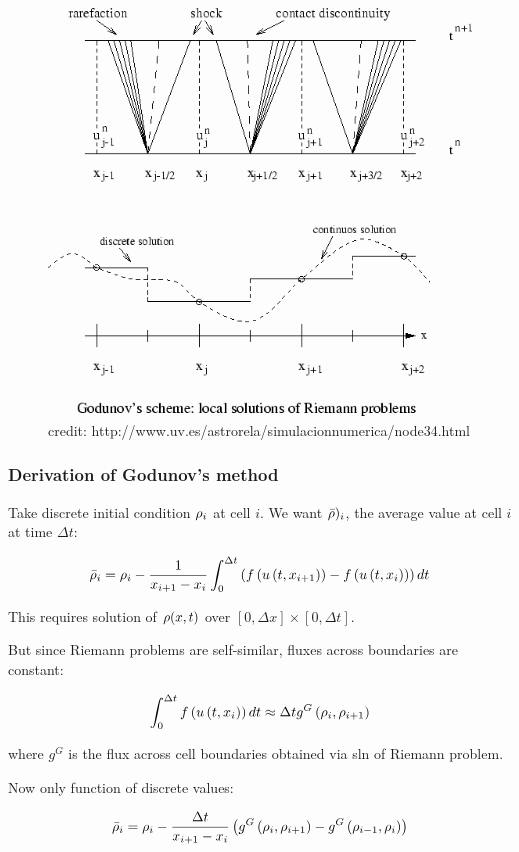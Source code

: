 \begin{frame}



\begin{figure}
\includegraphics[width=.65\columnwidth]{images/godunov}
\caption{credit: http://www.uv.es/astrorela/simulacionnumerica/node34.html}
\end{figure}


\end{frame}

\begin{frame}
\frametitle{Derivation of Godunov's method}

Take discrete initial condition $\rho_i$ at cell $i$. We want $\bar{\rho})_i$, the average value at cell $i$ at time $\Delta t$:

\begin{equation}
    \bar{\rho}_{i}=\rho_{i}-\frac{1}{x_{i+1}-x_{i}}\int_{0}^{\Delta t}\left(f\left(u\left(t,x_{i+1}\right)\right)-f\left(u\left(t,x_{i}\right)\right)\right)dt
\end{equation}


This requires solution of $\rho(x,t)$ over $[0,\Delta x]\times [0,\Delta t]$. 


But since Riemann problems are self-similar, fluxes across boundaries are constant:

\begin{equation}
    \int_{0}^{\Delta t}f\left(u\left(t,x_{i}\right)\right)dt\approx\Delta tg^{G}\left(\rho_{i},\rho_{i+1}\right)
\end{equation}

where $g^G$ is the flux across cell boundaries obtained via sln of Riemann problem.

Now only function of discrete values:

\begin{equation}
\bar{\rho}_{i}=\rho_{i}-\frac{\Delta t}{x_{i+1}-x_{i}}\left(g^{G}\left(\rho_{i},\rho_{i+1}\right)-g^{G}\left(\rho_{i-1},\rho_{i}\right)\right)    
\end{equation}


\end{frame}


